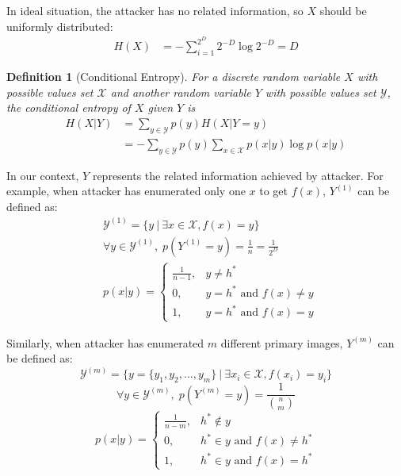 \documentclass[10pt, conference, compsocconf]{IEEEtran}
\newtheorem{mydef}{Definition}
\begin{document}
        In ideal situation, the attacker has no related information, so $X$ should
        be uniformly distributed:
        \begin{align*}
            H(X) &= -\sum_{i=1}^{2^D} 2^{-D} \log 2^{-D}
                = D
        \end{align*}

        \begin{mydef}[Conditional Entropy]\label{def_con_entropy}
            For a discrete random variable $X$ with
            possible values set $\mathcal X$ and another random
            variable $Y$ with possible values
            set $\mathcal{Y}$, the conditional entropy
            of $X$ given $Y$ is
            \begin{align}
                H(X|Y) &= \sum_{y \in \mathcal Y} p(y) H(X | Y = y)\\
                    &= -\sum_{y \in \mathcal Y} p(y) \sum_{x \in \mathcal X} p(x|y) \log p(x|y)
            \end{align}
        \end{mydef}

        In our context, $Y$ represents the related information
        achieved by attacker. For example, when attacker has enumerated only one
        $x$ to get $f(x)$, $Y^{(1)}$ can be defined as:
        \begin{align*}
            &\mathcal Y^{(1)} = \{y \: | \: \exists x \in \mathcal X, f(x) = y\}\\
            &\forall y \in \mathcal Y^{(1)}, \; p(Y^{(1)} = y) = \frac{1}{n} = \frac{1}{2^D}\\
            &p(x|y) = \begin{cases}
                \frac{1}{n-1}, &y \neq h^*\\
                0, &y = h^* \text{ and } f(x) \neq y\\
                1, &y = h^* \text{ and } f(x) = y
            \end{cases}
        \end{align*}

        Similarly, when attacker has enumerated $m$ different primary images, $Y^{(m)}$ can be defined
        as:
        \begin{equation*}
            \mathcal Y^{(m)} = \{ y = \{y_1, y_2, \ldots, y_m\} \: | \: \exists x_i \in \mathcal X, f(x_i) = y_i\}
        \end{equation*}
        \begin{equation*}
            \forall y \in \mathcal Y^{(m)}, \; p(Y^{(m)} = y) = \frac{1}{\binom{n}{m}}
        \end{equation*}
        \begin{equation*}
            p(x|y) = \begin{cases}
                \frac{1}{n-m}, &h^* \notin y\\
                0, &h^* \in y \text{ and } f(x) \neq h^*\\
                1, &h^* \in y \text{ and } f(x) = h^*
            \end{cases}
        \end{equation*}
\end{document}
